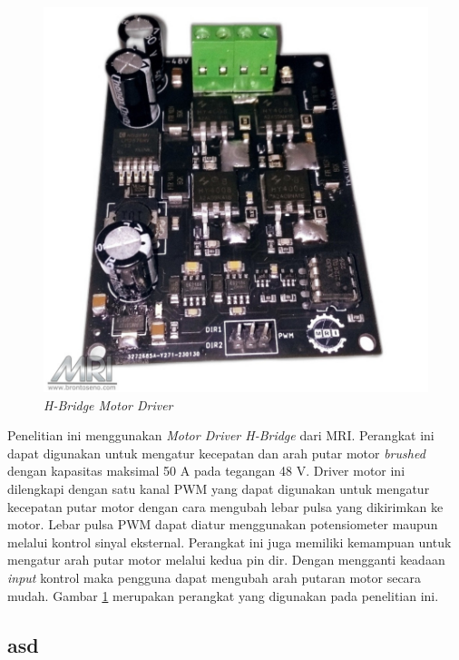 \begin{figure} [ht]
    \centering
        \includegraphics[scale=0.2]{gambar/MotorDriver.png}
        \caption{\emph{H-Bridge Motor Driver}}
        \label{fig:DriverMotor}
\end{figure}

Penelitian ini menggunakan \emph{Motor Driver H-Bridge} dari MRI. Perangkat ini dapat digunakan untuk mengatur kecepatan dan arah putar motor \emph{brushed} dengan kapasitas maksimal 50 A pada tegangan 48 V. Driver motor ini dilengkapi dengan satu kanal PWM yang dapat digunakan untuk mengatur kecepatan putar motor dengan cara mengubah lebar pulsa yang dikirimkan ke motor. Lebar pulsa PWM dapat diatur menggunakan potensiometer maupun melalui kontrol sinyal eksternal. Perangkat ini juga memiliki kemampuan untuk mengatur arah putar motor melalui kedua pin dir. Dengan mengganti keadaan \emph{input} kontrol maka pengguna dapat mengubah arah putaran motor secara mudah. Gambar \ref{fig:DriverMotor} merupakan perangkat yang digunakan pada penelitian ini.



\subsection{asd}